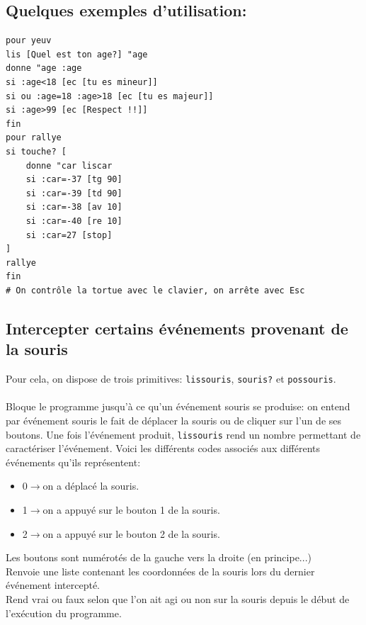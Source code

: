 \subsection{Quelques exemples d'utilisation:}
\begin{verbatim}
pour yeuv
lis [Quel est ton age?] "age
donne "age :age
si :age<18 [ec [tu es mineur]]
si ou :age=18 :age>18 [ec [tu es majeur]]
si :age>99 [ec [Respect !!]]
fin
pour rallye
si touche? [
	donne "car liscar
	si :car=-37 [tg 90]
	si :car=-39 [td 90]
	si :car=-38 [av 10]
	si :car=-40 [re 10]
	si :car=27 [stop]
]
rallye
fin
# On contrôle la tortue avec le clavier, on arrête avec Esc
\end{verbatim}
\subsection{Intercepter certains événements provenant de la souris}
Pour cela, on dispose de trois primitives: \texttt{lissouris}, \texttt{souris?} et \texttt{possouris}. \\ \\
Bloque le programme jusqu'à ce qu'un événement souris se produise: on entend par événement souris le fait de déplacer la souris ou de cliquer sur l'un de ses boutons. Une fois l'événement produit, \texttt{lissouris} rend un nombre permettant de caractériser l'événement. Voici les différents codes associés aux différents événements qu'ils représentent:
\begin{itemize}
 \item 0$\to$on a déplacé la souris.
 \item 1$\to$on a appuyé sur le bouton 1 de la souris.
 \item 2$\to$on a appuyé sur le bouton 2 de la souris.
\end{itemize}
Les boutons sont numérotés de la gauche vers la droite (en principe...)\\ 
Renvoie une liste contenant les coordonnées de la souris lors du dernier événement intercepté. \\
Rend vrai ou faux selon que l'on ait agi ou non sur la souris depuis le début de l'exécution du programme.
